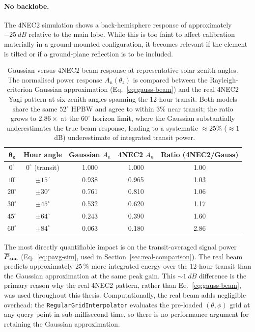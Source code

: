\paragraph{No backlobe.}
The 4NEC2 simulation shows a back-hemisphere response of approximately
$-25~\si{dB}$ relative to the main lobe. While this is too faint to affect
calibration materially in a ground-mounted configuration, it becomes relevant if the
element is tilted or if a ground-plane reflection is to be included.

\begin{table}[H]
  \centering
  \caption[Gaussian versus 4NEC2 beam response at representative solar zenith angles]{Gaussian versus 4NEC2 beam response at representative solar zenith angles.\\[4pt]
  The normalised power response $A_n(\theta_z)$ is compared between the
  Rayleigh-criterion Gaussian approximation (Eq.~\eqref{eq:gauss-beam}) and
  the real 4NEC2 Yagi pattern at six zenith angles spanning the 12-hour
  transit. Both models share the same $52^\circ$ HPBW and agree to within
  3\% near transit; the ratio grows to $2.86\times$ at the $60^\circ$ horizon
  limit, where the Gaussian substantially underestimates the true beam
  response, leading to a systematic $\approx25\%$ ($\approx1$~dB) underestimate
  of integrated transit power.}
  \label{tab:beam-comparison}
  \renewcommand{\arraystretch}{1.3}
  \begin{tabular}{c c c c c}
    \toprule
    $\boldsymbol{\theta_z}$ & \textbf{Hour angle} & \textbf{Gaussian} $A_n$
      & \textbf{4NEC2} $A_n$ & \textbf{Ratio (4NEC2/Gauss)} \\
    \midrule
    $0^\circ$  & $0^\circ$ (transit) & 1.000 & 1.000 & 1.00 \\
    $10^\circ$ & $\pm15^\circ$       & 0.938 & 0.965 & 1.03 \\
    $20^\circ$ & $\pm30^\circ$       & 0.761 & 0.810 & 1.06 \\
    $30^\circ$ & $\pm45^\circ$       & 0.532 & 0.620 & 1.17 \\
    $45^\circ$ & $\pm64^\circ$       & 0.243 & 0.390 & 1.60 \\
    $60^\circ$ & $\pm84^\circ$       & 0.063 & 0.180 & 2.86 \\
    \bottomrule
  \end{tabular}
\end{table}

The most directly quantifiable impact is on the transit-averaged signal power
$\overline{P}_{\rm sim}$ (Eq.~\eqref{eq:pavg-sim}, used in Section~\ref{sec:real-comparison}).
The real beam predicts approximately $25\,\%$ more integrated energy over the
12-hour transit than the Gaussian approximation at the same peak gain. This
$\sim\!1~\si{dB}$ difference is the primary reason why the real 4NEC2 pattern, rather
than Eq.~\eqref{eq:gauss-beam}, was used throughout this thesis. Computationally, the
real beam adds negligible overhead: the \texttt{RegularGridInterpolator} evaluates the
pre-loaded $({\theta},{\phi})$ grid at any query point in sub-millisecond time, so there
is no performance argument for retaining the Gaussian approximation.

